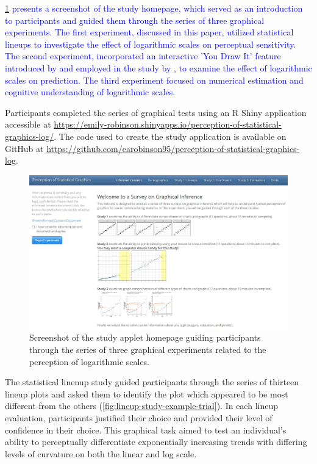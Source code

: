 \documentclass[12pt]{article}
\begin{document}
\cref{fig:study-homepage}
{\textcolor{blue}{presents a screenshot of the study homepage, which served as an introduction to participants and guided them through the series of three graphical experiments. The first experiment, discussed in this paper, utilized statistical lineups to investigate the effect of logarithmic scales on perceptual sensitivity. The second experiment, incorporated an interactive 'You Draw It' feature introduced by}}
\citet{aisch2015you} {\textcolor{blue}{and employed in the study by}}
\citet{robinson2022eye},
{\textcolor{blue}{to examine the effect of logarithmic scales on prediction. The third experiment focused on numerical estimation and cognitive understanding of logarithmic scales.}}

Participants completed the series of graphical tests using an R Shiny
application \citep{shiny_pkg} accessible at
\url{https://emily-robinson.shinyapps.io/perception-of-statistical-graphics-log/}.
The code used to create the study application is available on GitHub at
\url{https://github.com/earobinson95/perception-of-statistical-graphics-log}.

\begin{figure}[tbp]

{\centering \includegraphics[width=1\linewidth,]{images/study-homepage} 

}

\caption[Study applet homepage]{Screenshot of the study applet homepage guiding participants through the series of three graphical experiments related to the perception of logarithmic scales.}\label{fig:study-homepage}
\end{figure}

The statistical linenup study guided participants through the series of
thirteen lineup plots and asked them to identify the plot which appeared
to be most different from the others
(\cref{fig:lineup-study-example-trial}). In each lineup evaluation,
participants justified their choice and provided their level of
confidence in their choice. This graphical task aimed to test an
individual's ability to perceptually differentiate exponentially
increasing trends with differing levels of curvature on both the linear
and log scale.
\end{document}
